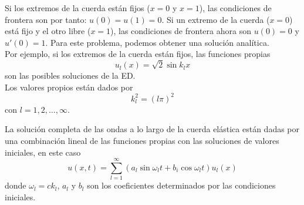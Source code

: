 \begin{frame}
Si los extremos de la cuerda están fijos ($x=0$ y $x=1$), las condiciones de frontera son por tanto: $u(0)=u(1)=0$. Si un extremo de la cuerda ($x=0$) está fijo y el otro libre ($x=1$), las condiciones de frontera ahora son $u(0)=0$ y $u'(0)=1$. Para este problema, podemos obtener una solución analítica.
\\
\medskip
Por ejemplo, si los extremos de la cuerda están fijos, las funciones propias
\begin{equation}
u_{l}(x) = \sqrt{2} \sin k_{l} x
\end{equation}
son las posibles soluciones de la ED.
\\
\medskip
\pause
Los valores propios están dados por
\begin{equation}
k_{l}^{2} = (l \pi)^{2}
\end{equation}
con $l=1,2,\ldots,\infty$. 
\end{frame}
\begin{frame}
La solución completa de las ondas a lo largo de la cuerda elástica están dadas por una combinación lineal de las funciones propias con las soluciones de valores iniciales, en este caso
\begin{equation}
u(x,t) = \sum_{l=1}^{\infty} (a_{l} \sin \omega_{l} t + b_{i} \cos \omega_{l} t) u_{l}(x)
\end{equation}
donde $\omega_{l} = c k_{l}$, $a_{l}$ y $b_{l}$ son los coeficientes determinados por las condiciones iniciales.
\end{frame}
